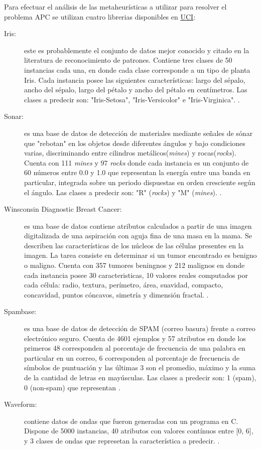 \documentclass{ci5652}
\begin{document}
Para efectuar el análisis de las metaheurísticas a utilizar para resolver el
problema APC se utilizan cuatro librerias disponibles en 
\href{http://archive.ics.uci.edu/ml/index.php}{UCI}:

\begin{description}
  \item [Iris:] este es probablemente el conjunto de datos mejor conocido y citado
  en la literatura de reconocimiento de patrones. Contiene tres clases de 50
  instancias cada una, en donde cada clase corresponde a un tipo de planta Iris.
  Cada instancia posee las siguientes características: largo del sépalo, ancho 
  del sépalo, largo del pétalo y ancho del pétalo en centímetros. Las clases a
  predecir son: "Iris-Setosa", "Iris-Versicolor" e "Iris-Virginica". 
  \cite{UCI_Iris}.
  
  \item [Sonar:] es una base de datos de detección de materiales mediante señales 
  de sónar que "rebotan" en los objetos desde diferentes ángulos y bajo 
  condiciones varias, discriminando entre cilindros metálicos(\textit{mines}) y
  rocas(\textit{rocks}). Cuenta con 111 \textit{mines} y 97 \textit{rocks} donde
  cada instancia es un conjunto de 60 números entre 0.0 y 1.0 que representan la
  energía entre una banda en particular, integrada sobre un periodo dispuestas 
  en orden cresciente según el ángulo. Las clases a predecir son: "R"
  (\textit{rocks}) y "M" (\textit{mines}). \cite{UCI_Sonar}.
   
  \item [Winsconsin Diagnostic Breast Cancer:] es una base de datos contiene
  atributos calculados a partir de una imagen digitalizada de una aspiración con
  aguja fina de una masa en la mama. Se describen las características de los
  núcleos de las células presentes en la imagen. La tarea consiste en determinar
  si un tumor encontrado es benigno o maligno. Cuenta con 357 tumores beningnos
  y 212 malignos en donde cada instancia posee 30 caracteristicas, 10 valores
  reales computados por cada célula: radio, textura, perímetro, área, suavidad,
  compacto, concavidad, puntos cóncavos, simetría y dimensión fractal.
  \cite{UCI_WDBC}.

  \item [Spambase:] es una base de datos de detección de SPAM (correo basura)
  frente a correo electrónico seguro. Cuenta de 4601 ejemplos y 57 atributos en
  donde los primeros 48 corresponden al porcentaje de frecuencia de una palabra
  en particular en un correo, 6 corresponden al porcentaje de frecuencia de
  símbolos de puntuación y las últimas 3 son el promedio, máximo y la suma de la
  cantidad de letras en mayúsculas. Las clases a predecir son: 1 (spam), 0 
  (non-spam) que representan \cite{UCI_SpamBase}.
  
  \item [Waveform:] contiene datos de ondas que fueron generadas con un programa
  en C. Dispone de 5000 instancias, 40 atributos con valores contínuos entre 
  [0, 6], y 3 clases de ondas que represetan la característica a predecir. 
  \cite{UCI_Waveform}.
  
\end{description}
\end{document}
